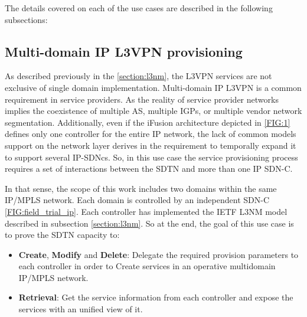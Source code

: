 \documentclass[a4paper,fleqn]{cas-dc}
\begin{document}
The details covered on each of the use cases are described in the following subsections:

\subsection{Multi-domain IP L3VPN provisioning}
\label{section:muli-l3nm}

As described previously in the \cref{section:l3nm}, the L3VPN services are not exclusive of single domain implementation. Multi-domain IP L3VPN is a common requirement in service providers. As the reality of service provider networks implies the coexistence of multiple AS, multiple IGPs, or multiple vendor network segmentation. Additionally, even if the iFusion architecture depicted in \ref{FIG:1} defines only one controller for the entire IP network, the lack of common models support on the network layer derives in the requirement to temporally expand it to support several IP-SDNcs. So, in this use case the service provisioning process requires a set of interactions between the SDTN and more than one IP SDN-C.

In that sense, the scope of this work includes two domains within the same IP/MPLS network. Each domain is controlled by an independent SDN-C \ref{FIG:field_trial_ip}. Each controller has implemented the IETF L3NM model described in subsection \cref{section:l3nm}. So at the end, the goal of this use case is to prove the SDTN capacity to:
\begin{itemize}
    \item \textbf{Create}, \textbf{Modify} and \textbf{Delete}: Delegate the required provision parameters to each controller in order to Create services in an operative multidomain IP/MPLS network.
    \item \textbf{Retrieval}: Get the service information from each controller and expose the services with an unified view of it.
\end{itemize}
\end{document}
